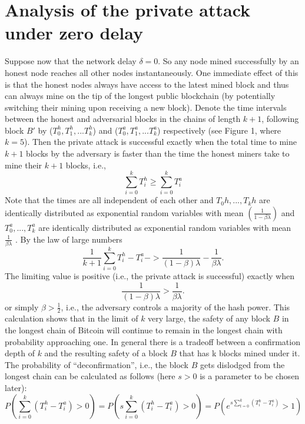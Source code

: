 \section{Analysis of the private attack under zero delay}
Suppose now that the network delay $\delta = 0$. So any node mined successfully by an honest node reaches all other nodes instantaneously. One immediate eﬀect of this is that the honest nodes always have access to the latest mined block and thus can always mine on the tip of the longest public blockchain (by potentially switching their mining upon receiving a new block). Denote the time intervals between the honest and adversarial blocks in the chains of length $k + 1$, following block $B′$ by ($T_{0}^{h}, T_{1}^{h}, . . . T_{k}^{h}$) and ($T_{0}^{a}, T_{1}^{a}, . . . T_{k}^{a}$) respectively (see Figure 1, where $k = 5$). Then the private attack is successful exactly when the total time to mine $k + 1$ blocks by the adversary is faster than the time the honest miners take to mine their $k + 1$ blocks, i.e.,
\begin{equation*}
	\sum_{i=0}^{k} T_{i}^{h} \geq \sum_{i=0}^{k} T_{i}^{a}
\end{equation*}
Note that the times are all independent of each other and $T_{0}{h}, . . . , T_{k}{h}$ are identically distributed as exponential random variables with mean $(\frac{1}{1 - \beta\lambda})$ and $T_{0}^{a}, . . . , T_{k}^{a}$ are identically distributed as exponential random variables with mean $\frac{1}{\beta\lambda}$ . By the law of large numbers
\begin{equation*}
	\frac{1}{k + 1}\sum_{i=0}^{k} T_{i}^{h} - T_{i}^{a}   -> \frac{1}{(1 - \beta) \lambda} - \frac{1}{\beta\lambda}.
\end{equation*}
The limiting value is positive (i.e., the private attack is successful) exactly when
\begin{equation*}
	\frac{1}{(1 - \beta) \lambda} > \frac{1}{\beta\lambda}.
\end{equation*}
or simply $\beta > \frac{1}{2}$, i.e., the adversary controls a majority of the hash power. This calculation shows that in the limit of $k$ very large, the safety of any block $B$ in the longest chain of Bitcoin will continue to remain in the longest chain with probability approaching one. In general there is a tradeoﬀ between a confirmation depth of $k$ and the resulting safety of a block $B$ that has k blocks mined under it. The probability of “deconfirmation”, i.e., the block $B$ gets dislodged from the longest chain can be calculated as follows (here $s > 0$ is a parameter to be chosen later):
\begin{equation}
	P(\sum_{i=0}^{k}(T_{i}^{h} - T_{i}^{a}) > 0) = P(s\sum_{i=0}^{k}(T_{i}^{h} - T_{i}^{a}) > 0) = P(e^{s\sum_{t=0}^{k}(T_{i}^{h} - T_{i}^{a})} > 1)	
\end{equation}


